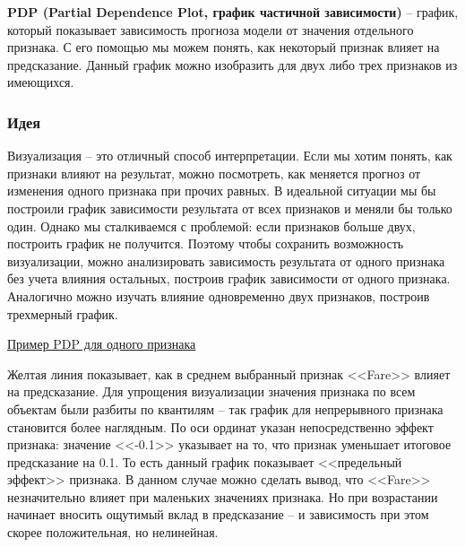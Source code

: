 \textbf{PDP (Partial Dependence Plot, график частичной зависимости)} -- график, который показывает зависимость прогноза модели от значения отдельного признака. С его помощью мы можем понять, как некоторый признак влияет на предсказание. Данный график можно изобразить для двух либо трех признаков из имеющихся.

\subsubsection{Идея}
Визуализация -- это отличный способ интерпретации. Если мы хотим понять, как признаки влияют на результат, можно посмотреть, как меняется прогноз от изменения одного признака при прочих равных. В идеальной ситуации мы бы построили график зависимости результата от всех признаков и меняли бы только один. Однако мы сталкиваемся с проблемой: если признаков больше двух, построить график не получится. Поэтому чтобы сохранить возможность визуализации, можно анализировать зависимость результата от одного признака без учета влияния остальных, построив график зависимости от одного признака. Аналогично можно изучать влияние одновременно двух признаков, построив трехмерный график.

\underline{Пример PDP для одного признака} \cite{pdpgit}
\vspace{-7mm}

\begin{figure}[h]
\end{figure}

Желтая линия показывает, как в среднем выбранный признак <<Fare>> влияет на предсказание. Для упрощения визуализации значения признака по всем объектам были разбиты по квантилям -- так график для непрерывного признака становится более наглядным. По оси ординат указан непосредственно эффект признака: значение <<-0.1>> указывает на то, что признак уменьшает итоговое предсказание на 0.1. То есть данный график показывает <<предельный эффект>> признака. В данном случае можно сделать вывод, что <<Fare>> незначительно влияет при маленьких значениях признака. Но при возрастании начинает вносить ощутимый вклад в предсказание -- и зависимость при этом скорее положительная, но нелинейная.

